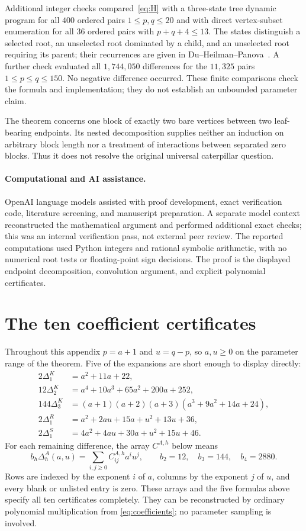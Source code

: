 \documentclass[11pt,a4paper]{article}
\begin{document}
Additional integer checks compared~\eqref{eq:H} with a three-state tree
dynamic program for all $400$ ordered pairs $1\leq p,q\leq20$ and with
direct vertex-subset enumeration for all $36$ ordered pairs with
$p+q+4\leq13$. The states distinguish a selected root, an unselected root
dominated by a child, and an unselected root requiring its parent; their
recurrences are given in Du--Heilman--Panova~\cite[Section~4.1]{Du2026}.
A further check evaluated all $1{,}744{,}050$ differences for the
$11{,}325$ pairs $1\leq p\leq q\leq150$. No negative difference occurred.
These finite comparisons check the formula and implementation; they do not
establish an unbounded parameter claim.

The theorem concerns one block of exactly two bare vertices between two
leaf-bearing endpoints. Its nested decomposition supplies neither an
induction on arbitrary block length nor a treatment of interactions between
separated zero blocks. Thus it does not resolve the original universal
caterpillar question.

\paragraph{Computational and AI assistance.}
OpenAI language models assisted with proof development, exact verification
code, literature screening, and manuscript preparation. A separate model
context reconstructed the mathematical argument and performed additional
exact checks; this was an internal verification pass, not external peer
review. The reported computations used Python integers and rational symbolic arithmetic,
with no numerical root tests or floating-point sign decisions. The proof is
the displayed endpoint decomposition, convolution argument, and explicit
polynomial certificates.

\appendix
\section{The ten coefficient certificates}\label{app:certificates}

Throughout this appendix $p=a+1$ and $u=q-p$, so $a,u\geq0$ on the
parameter range of the theorem. Five of the expansions are short enough
to display directly:
\begin{align*}
 2\Delta^K_1&=a^2+11a+22,\\
 12\Delta^K_2&=a^4+10a^3+65a^2+200a+252,\\
 144\Delta^K_3&=(a+1)(a+2)(a+3)(a^3+9a^2+14a+24),\\
 2\Delta^R_1&=a^2+2au+15a+u^2+13u+36,\\
 2\Delta^S_1&=4a^2+4au+30a+u^2+15u+46.
\end{align*}
For each remaining difference, the array $C^{A,h}$ below means
\[
  b_h\Delta^A_h(a,u)=\sum_{i,j\geq0}C^{A,h}_{ij}a^iu^j,
  \qquad b_2=12,\quad b_3=144,\quad b_4=2880.
\]
Rows are indexed by the exponent $i$ of $a$, columns by the exponent $j$
of $u$, and every blank or unlisted entry is zero. These arrays and the
five formulas above specify all ten certificates completely. They can be
reconstructed by ordinary polynomial multiplication from
\eqref{eq:coefficients}; no parameter sampling is involved.
\end{document}
